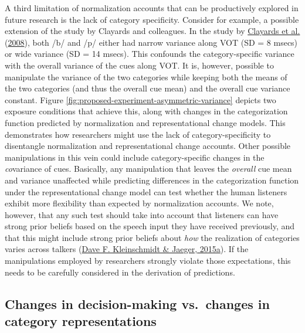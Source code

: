 \documentclass[
  11pt,
  english,
  man,floatsintext]{apa6}
\begin{document}
A third limitation of normalization accounts that can be productively explored in future research is the lack of category specificity. Consider for example, a possible extension of the study by Clayards and colleagues. In the study by \protect\hyperlink{ref-clayards2008}{Clayards et al.} (\protect\hyperlink{ref-clayards2008}{2008}), both /b/ and /p/ either had narrow variance along VOT (SD = 8 msecs) or wide variance (SD = 14 msecs). This confounds the category-specific variance with the overall variance of the cues along VOT. It is, however, possible to manipulate the variance of the two categories while keeping both the means of the two categories (and thus the overall cue mean) and the overall cue variance constant. Figure \ref{fig:proposed-experiment-asymmetric-variance} depicts two exposure conditions that achieve this, along with changes in the categorization function predicted by normalization and representational change models. This demonstrates how researchers might use the lack of category-specificity to disentangle normalization and representational change accounts. Other possible manipulations in this vein could include category-specific changes in the \emph{co}variance of cues. Basically, any manipulation that leaves the \emph{overall} cue mean and variance unaffected while predicting differences in the categorization function under the representational change model can test whether the human listeners exhibit more flexibility than expected by normalization accounts. We note, however, that any such test should take into account that listeners can have strong prior beliefs based on the speech input they have received previously, and that this might include strong prior beliefs about \emph{how} the realization of categories varies across talkers (\protect\hyperlink{ref-kleinschmidt-jaeger2015}{Dave F. Kleinschmidt \& Jaeger, 2015a}). If the manipulations employed by researchers strongly violate those expectations, this needs to be carefully considered in the derivation of predictions.



\hypertarget{changes-in-decision-making-vs.-changes-in-category-representations}{%
\subsection{Changes in decision-making vs.~changes in category representations}\label{changes-in-decision-making-vs.-changes-in-category-representations}}
\end{document}

